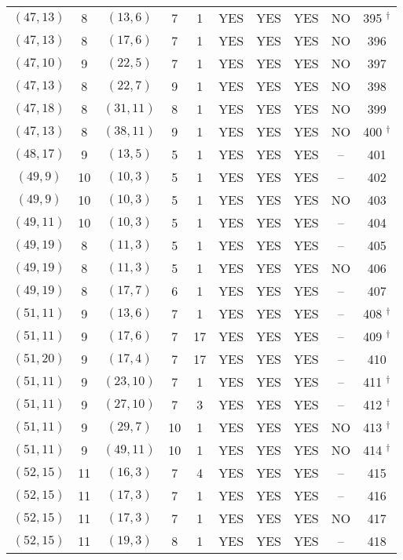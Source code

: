 \begin{longtable}{|c|c|c|c|c|c|c|c|c|c|}
$(47, 13)$ & 8 & $(13, 6)$ & 7 & 1 & YES & YES & YES & NO & 395 ${}^\dagger$\\
$(47, 13)$ & 8 & $(17, 6)$ & 7 & 1 & YES & YES & YES & NO & 396\\
$(47, 10)$ & 9 & $(22, 5)$ & 7 & 1 & YES & YES & YES & NO & 397\\
$(47, 13)$ & 8 & $(22, 7)$ & 9 & 1 & YES & YES & YES & NO & 398\\
$(47, 18)$ & 8 & $(31, 11)$ & 8 & 1 & YES & YES & YES & NO & 399\\
$(47, 13)$ & 8 & $(38, 11)$ & 9 & 1 & YES & YES & YES & NO & 400 ${}^\dagger$\\
$(48, 17)$ & 9 & $(13, 5)$ & 5 & 1 & YES & YES & YES & -- & 401\\
$(49, 9)$ & 10 & $(10, 3)$ & 5 & 1 & YES & YES & YES & -- & 402\\
$(49, 9)$ & 10 & $(10, 3)$ & 5 & 1 & YES & YES & YES & NO & 403\\
$(49, 11)$ & 10 & $(10, 3)$ & 5 & 1 & YES & YES & YES & -- & 404\\
$(49, 19)$ & 8 & $(11, 3)$ & 5 & 1 & YES & YES & YES & -- & 405\\
$(49, 19)$ & 8 & $(11, 3)$ & 5 & 1 & YES & YES & YES & NO & 406\\
$(49, 19)$ & 8 & $(17, 7)$ & 6 & 1 & YES & YES & YES & -- & 407\\
$(51, 11)$ & 9 & $(13, 6)$ & 7 & 1 & YES & YES & YES & -- & 408 ${}^\dagger$\\
$(51, 11)$ & 9 & $(17, 6)$ & 7 & 17 & YES & YES & YES & -- & 409 ${}^\dagger$\\
$(51, 20)$ & 9 & $(17, 4)$ & 7 & 17 & YES & YES & YES & -- & 410\\
$(51, 11)$ & 9 & $(23, 10)$ & 7 & 1 & YES & YES & YES & -- & 411 ${}^\dagger$\\
$(51, 11)$ & 9 & $(27, 10)$ & 7 & 3 & YES & YES & YES & -- & 412 ${}^\dagger$\\
$(51, 11)$ & 9 & $(29, 7)$ & 10 & 1 & YES & YES & YES & NO & 413 ${}^\dagger$\\
$(51, 11)$ & 9 & $(49, 11)$ & 10 & 1 & YES & YES & YES & NO & 414 ${}^\dagger$\\
$(52, 15)$ & 11 & $(16, 3)$ & 7 & 4 & YES & YES & YES & -- & 415\\
$(52, 15)$ & 11 & $(17, 3)$ & 7 & 1 & YES & YES & YES & -- & 416\\
$(52, 15)$ & 11 & $(17, 3)$ & 7 & 1 & YES & YES & YES & NO & 417\\
$(52, 15)$ & 11 & $(19, 3)$ & 8 & 1 & YES & YES & YES & -- & 418\\

\end{longtable}
